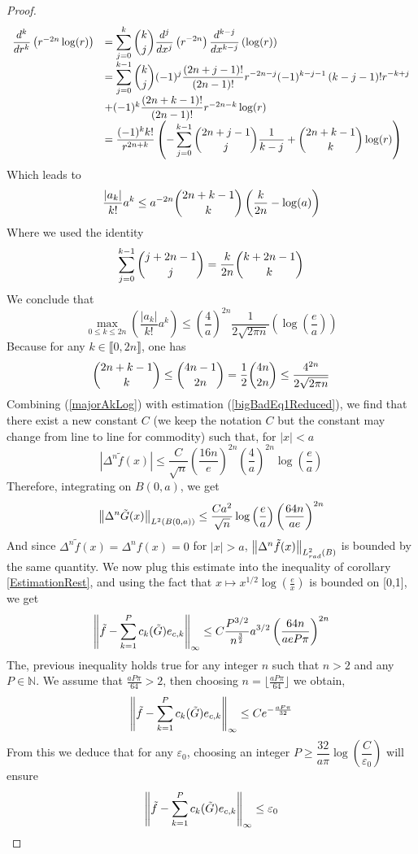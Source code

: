 \documentclass[11pt,a4paper]{article}
\begin{document}
\begin{The}
\begin{proof}
\[\begin{array}{rl}
\dfrac{d^k }{dr^k}\left(r^{-2n}\log(r)\right) &= \displaystyle\sum_{j=0}^k\dbinom{k}{j}\dfrac{d^j}{dx^j}\left(r^{-2n}\right)\dfrac{d^{k-j}}{dx^{k-j}}\left(\log(r)\right)\\
&= \displaystyle\sum_{j=0}^{k-1} \dbinom{k}{j}(-1)^j \dfrac{(2n+j-1)!}{(2n-1)!}r^{-2n-j}(-1)^{k-j-1}\left(k-j-1\right)!r^{-k+j}\\ & + (-1)^k \dfrac{(2n+k-1)!}{(2n-1)!}r^{-2n-k}\log(r)\\
& = \dfrac{(-1)^k k!}{r^{2n+k}} \left(-\displaystyle\sum_{j=0}^{k-1}\dbinom{2n+j-1}{j}\dfrac{1}{k-j}+\dbinom{2n+k-1}{k}\log(r)\right)
\end{array}\]
Which leads to \[\dfrac{|a_k|}{k!}a^k \leq a^{-2n} \dbinom{2n + k -1}{k}\left(\frac{k}{2n}-\log(a)\right)\]
Where we used the identity 
\begin{equation}
\sum_{j=0}^{k-1}\dbinom{j+2n-1}{j} = \dfrac{k}{2n}\dbinom{k+2n-1}{k}
\label{sommekparmminplusk}
\end{equation}
We conclude that \begin{equation}
\max_{0\leq k \leq 2n}\left(\dfrac{|a_k|}{k!}a^k\right) \leq \left(\frac{4}{a}\right)^{2n}\dfrac{1}{2\sqrt{2\pi n}}\left(\log\left(\frac{e}{a}\right)\right)
\label{majorAkLog} 
\end{equation}
Because for any $k \in \llbracket 0,2n\rrbracket$, one has 
\begin{equation}
\dbinom{2n+k-1}{k}\leq \dbinom{4n-1}{2n} = \frac{1}{2}\dbinom{4n}{2n} \leq \dfrac{4^{2n}}{2\sqrt{2\pi n}}
\label{nparmi2n}
\end{equation}
Combining (\ref{majorAkLog}) with estimation (\ref{bigBadEq1Reduced}), we find that there exist a new constant $C$ (we keep the notation $C$ but the constant may change from line to line for commodity) such that, for $|x|<a$
\[|\Delta^n \tilde{f} (x)|\leq \dfrac{C}{\sqrt{n}}\left( \frac{16n}{e}\right)^{2n}\left(\frac{4}{a}\right)^{2n}\log\left(\dfrac{e}{a}\right)  \]
Therefore, integrating on $B(0,a)$, we get
\[ \left\|\Delta^n \tilde{G}(x)\right\|_{L^2(B(0,a))} \leq \dfrac{C a^2}{\sqrt{n}}\log\left(\frac{e}{a}\right)\left( \frac{64n}{ae}\right)^{2n}\]
And since $\Delta^n \tilde{f}(x) = \Delta^n f(x) = 0$ for $|x|>a$, $\left\|\Delta^n \tilde{f}(x)\right\|_{L^2_{rad}(B)}$ is bounded by the same quantity. 
We now plug this estimate into the inequality of corollary \ref{EstimationRest}, and using the fact that $x\mapsto x^{1/2}\log\left(\frac{e}{x}\right)$ is bounded on [0,1], we get
\[ \left\|\tilde{f} - \sum_{k=1}^{P}c_k(\tilde{G})e_{c,k}\right\|_{\infty} \leq C \dfrac{P^{3/2}}{n^{\frac{3}{2}}} a^{3/2}\left( \frac{64 n}{ae P \pi}\right)^{2n}\] 
The, previous inequality holds true for any integer $n$ such that $n>2$ and any $P \in \mathbb{N}$. We assume that $\frac{aP\pi}{64} >2$, then choosing $n = \lfloor \frac{aP\pi}{64}\rfloor $ we obtain, 
\[ \left\|\tilde{f} - \sum_{k=1}^{P}c_k(\tilde{G})e_{c,k}\right\|_{\infty} \leq C e^{-\frac{aP\pi}{32}}\] 
From this we deduce that for any $\varepsilon_0$, choosing an integer $P \geq \dfrac{32}{a\pi} \log\left(\dfrac{C}{\varepsilon_0}\right)$ will ensure 
\[ \left\|\tilde{f} - \sum_{k=1}^{P}c_k(\tilde{G})e_{c,k}\right\|_{\infty} \leq \varepsilon_0\] 


\end{proof}
\end{The}
\end{document}
